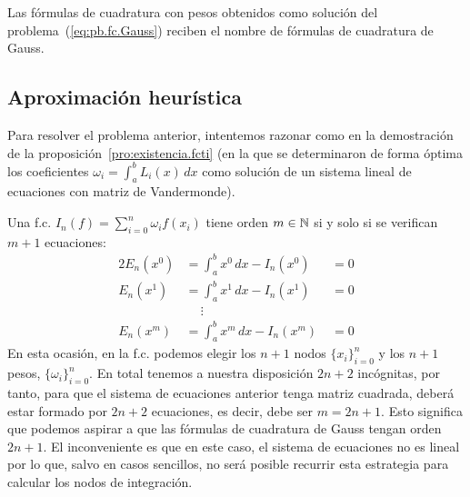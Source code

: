 \begin{definition}
  Las fórmulas de cuadratura con pesos obtenidos como solución del
  problema~(\ref{eq:pb.fc.Gauss}) reciben el nombre de fórmulas de
  cuadratura de Gauss.
\end{definition}
\subsection*{Aproximación heurística}
Para resolver el problema anterior, intentemos razonar como en la
demostración de la proposición~\ref{pro:existencia.fcti} (en la que se
determinaron de forma óptima los coeficientes $\omega_i=\int_a^b
L_i(x)\, dx$ como solución de un sistema lineal de ecuaciones con
matriz de Vandermonde).


Una f.c. $I_n(f)=\sum_{i=0}^n \omega_i f(x_i)$ tiene orden $m\in\operatorname{{\mathbb N}}$
si y solo si se verifican $m+1$ ecuaciones:
\begin{alignat*}{2}
  E_n(x^0)&=\int_a^b x^0\, dx -I_n(x^0)&\; =0 \\
  E_n(x^1)&=\int_a^b x^1\, dx -I_n(x^1)&\; =0 \\
  &~\quad\vdots \\
  E_n(x^m)&=\int_a^b x^m\, dx -I_n(x^m)&\; =0
\end{alignat*}
En esta ocasión, en la f.c. podemos elegir los $n+1$ nodos
$\{x_i\}_{i=0}^n$ y los $n+1$ pesos, $\{\omega_i\}_{i=0}^n$. En total
tenemos a nuestra disposición $2n+2$ incógnitas, por tanto, para que
el sistema de ecuaciones anterior tenga matriz cuadrada, deberá estar
formado por $2n+2$ ecuaciones, es decir, debe ser $m=2n+1$. Esto
significa que podemos aspirar a que las fórmulas de cuadratura de
Gauss tengan orden $2n+1$.  El inconveniente es que en este caso, el
sistema de ecuaciones no es lineal por lo que, salvo en casos
sencillos, no será posible recurrir esta estrategia para calcular los
nodos de integración.

